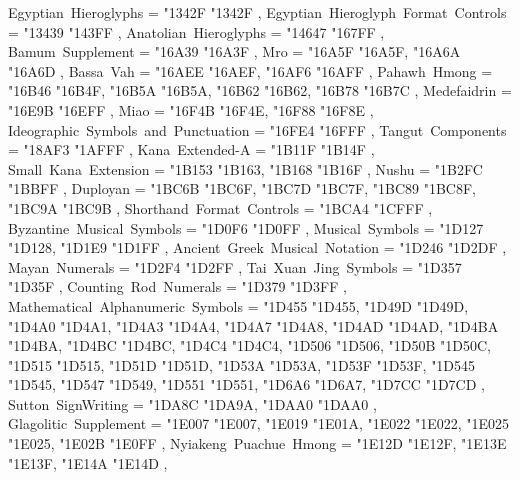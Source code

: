 {    Egyptian~Hieroglyphs                           = { {"1342F} {"1342F} },
    Egyptian~Hieroglyph~Format~Controls            = { {"13439} {"143FF} },
    Anatolian~Hieroglyphs                          = { {"14647} {"167FF} },
    Bamum~Supplement                               = { {"16A39} {"16A3F} },
    Mro                                            = { {"16A5F} {"16A5F}, {"16A6A} {"16A6D} },
    Bassa~Vah                                      = { {"16AEE} {"16AEF}, {"16AF6} {"16AFF} },
    Pahawh~Hmong                                   = { {"16B46} {"16B4F}, {"16B5A} {"16B5A}, {"16B62} {"16B62}, {"16B78} {"16B7C} },
    Medefaidrin                                    = { {"16E9B} {"16EFF} },
    Miao                                           = { {"16F4B} {"16F4E}, {"16F88} {"16F8E} },
    Ideographic~Symbols~and~Punctuation            = { {"16FE4} {"16FFF} },
    Tangut~Components                              = { {"18AF3} {"1AFFF} },
    Kana~Extended-A                                = { {"1B11F} {"1B14F} },
    Small~Kana~Extension                           = { {"1B153} {"1B163}, {"1B168} {"1B16F} },
    Nushu                                          = { {"1B2FC} {"1BBFF} },
    Duployan                                       = { {"1BC6B} {"1BC6F}, {"1BC7D} {"1BC7F}, {"1BC89} {"1BC8F}, {"1BC9A} {"1BC9B} },
    Shorthand~Format~Controls                      = { {"1BCA4} {"1CFFF} },
    Byzantine~Musical~Symbols                      = { {"1D0F6} {"1D0FF} },
    Musical~Symbols                                = { {"1D127} {"1D128}, {"1D1E9} {"1D1FF} },
    Ancient~Greek~Musical~Notation                 = { {"1D246} {"1D2DF} },
    Mayan~Numerals                                 = { {"1D2F4} {"1D2FF} },
    Tai~Xuan~Jing~Symbols                          = { {"1D357} {"1D35F} },
    Counting~Rod~Numerals                          = { {"1D379} {"1D3FF} },
    Mathematical~Alphanumeric~Symbols              = { {"1D455} {"1D455}, {"1D49D} {"1D49D}, {"1D4A0} {"1D4A1}, {"1D4A3} {"1D4A4}, {"1D4A7} {"1D4A8}, {"1D4AD} {"1D4AD}, {"1D4BA} {"1D4BA}, {"1D4BC} {"1D4BC}, {"1D4C4} {"1D4C4}, {"1D506} {"1D506}, {"1D50B} {"1D50C}, {"1D515} {"1D515}, {"1D51D} {"1D51D}, {"1D53A} {"1D53A}, {"1D53F} {"1D53F}, {"1D545} {"1D545}, {"1D547} {"1D549}, {"1D551} {"1D551}, {"1D6A6} {"1D6A7}, {"1D7CC} {"1D7CD} },
    Sutton~SignWriting                             = { {"1DA8C} {"1DA9A}, {"1DAA0} {"1DAA0} },
    Glagolitic~Supplement                          = { {"1E007} {"1E007}, {"1E019} {"1E01A}, {"1E022} {"1E022}, {"1E025} {"1E025}, {"1E02B} {"1E0FF} },
    Nyiakeng~Puachue~Hmong                         = { {"1E12D} {"1E12F}, {"1E13E} {"1E13F}, {"1E14A} {"1E14D} },
}
